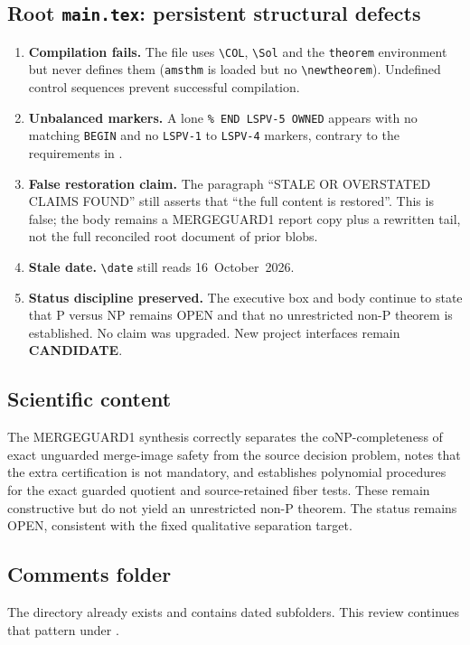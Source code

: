\documentclass[11pt]{article}
\newcommand{\CAND}{\textbf{CANDIDATE}}
\begin{document}
\subsection{Root \texttt{main.tex}: persistent structural defects}
\begin{enumerate}
\item \textbf{Compilation fails.} The file uses \verb|\COL|, \verb|\Sol| and
the \texttt{theorem} environment but never defines them (\texttt{amsthm} is
loaded but no \verb|\newtheorem|). Undefined control sequences prevent
successful compilation.
\item \textbf{Unbalanced markers.} A lone \verb|% END LSPV-5 OWNED| appears
with no matching \texttt{BEGIN} and no \texttt{LSPV-1} to \texttt{LSPV-4}
markers, contrary to the requirements in .
\item \textbf{False restoration claim.} The paragraph ``STALE OR OVERSTATED
CLAIMS FOUND'' still asserts that ``the full content is restored''. This
is false; the body remains a MERGEGUARD1 report copy plus a rewritten
tail, not the full reconciled root document of prior blobs.
\item \textbf{Stale date.} \verb|\date| still reads 16~October~2026.
\item \textbf{Status discipline preserved.} The executive box and body
continue to state that P versus NP remains OPEN and that no unrestricted
non-P theorem is established. No claim was upgraded. New project interfaces
remain \CAND{}.
\end{enumerate}

\subsection{Scientific content}
The MERGEGUARD1 synthesis correctly separates the coNP-completeness of
exact unguarded merge-image safety from the source decision problem, notes
that the extra certification is not mandatory, and establishes polynomial
procedures for the exact guarded quotient and source-retained fiber tests.
These remain constructive but do not yield an unrestricted non-P theorem.
The status remains OPEN, consistent with the fixed qualitative separation
target.

\subsection{Comments folder}
The directory  already exists and contains dated
subfolders. This review continues that pattern under
.
\end{document}
